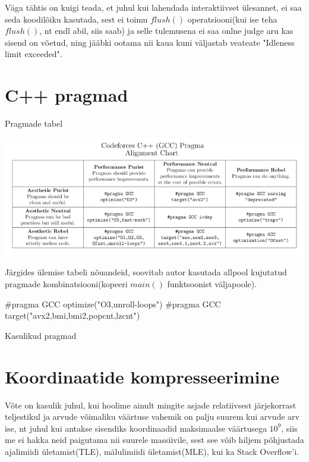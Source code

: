 \documentclass{trkut}
\begin{document}
\begin{appendices}
    \parencite{fast1}
    \parencite{fast2}
    
    Väga tähtis on kuigi teada, et juhul kui lahendada interaktiivset ülesannet, ei saa seda koodilõiku kasutada, sest ei toimu $flush()$ operatsiooni(kui ise teha $flush()$, nt endl abil, siis saab) ja selle tulemusena ei saa onlne judge aru kas sisend on võetud, ning jääbki ootama nii kaua kuni väljastab veateate "Idleness limit exceeded".

    \chapter{C++ pragmad}\label{lisa7}
    \tiny
    \normalsize
    
    \begin{table}[H]%
    \caption{Pragmade tabel}%
    \includegraphics[width=17cm]{pragmatabel.png}%
    \label{pragmas}%
    \end{table}
    
    Järgides ülemise tabeli nõuandeid, soovitab autor kasutada allpool kujutatud pragmade kombinatsiooni(kopeeri $main()$ funktsoonist väljapoole)\parencite{pragmas}.

\begin{cclol}
    #pragma GCC optimize("O3,unroll-loops")
    #pragma GCC target("avx2,bmi,bmi2,popcnt,lzcnt")
\end{cclol}
    \begin{kk}[H]
    \caption{Kasulikud pragmad}%
    \end{kk}



        
   


    \chapter{Koordinaatide kompresseerimine}\label{lisa8}
    \tiny
    \normalsize
    Võte on kasulik juhul, kui hoolime ainult mingite asjade relatiivsest järjekorrast teljestikul ja arvude võimaliku väärtuse vahemik on palju suurem kui arvude arv ise, nt juhul kui antakse sisendiks koordinaadid maksimaalse väärtusega $10^9$, siis me ei hakka neid paigutama nii suurele massiivile, sest see võib hiljem põhjustada ajalimiidi ületamist(TLE), mälulimiidi ületamist(MLE), kui ka Stack Overflow'i.


\end{appendices}
\end{document}
